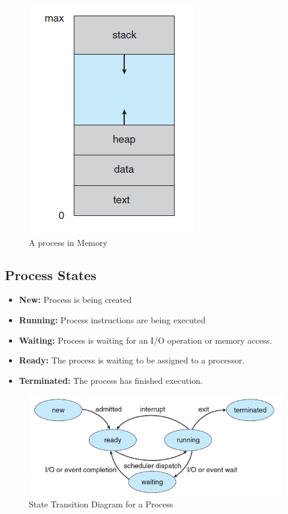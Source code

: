 \documentclass{article}
\theoremstyle{plain}
\theoremstyle{definition}
\begin{document}
\begin{figure}[ht]
    \centering
    \includegraphics{os12.png}
    \caption{A process in Memory}
    \label{fig:my_label_12}
\end{figure}

\subsection{Process States}
\begin{itemize}
    \item \textbf{New:} Process is being created
    
    \item \textbf{Running:} Process instructions are being executed
    
    \item \textbf{Waiting:} Process is waiting for an I/O operation or memory access. 
    
    \item \textbf{Ready:} The process is waiting to be assigned to a processor. 
    
    \item \textbf{Terminated:} The process has finished execution. 
\end{itemize}

\begin{figure}[h]
    \centering
    \includegraphics{os13.png}
    \caption{State Transition Diagram for a Process}
    \label{fig:my_label_13}
\end{figure}
\end{document}
